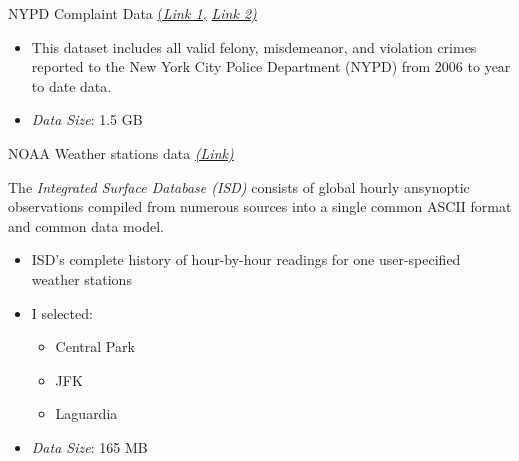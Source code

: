 \documentclass[10pt,ignorenonframetext,]{beamer}
\providecommand{\tightlist}{%
  \setlength{\itemsep}{0pt}\setlength{\parskip}{0pt}}
\begin{document}
\begin{frame}

\begin{block}{NYPD Complaint Data
\href{https://data.cityofnewyork.us/Public-Safety/NYPD-Complaint-Data-Historic/qgea-i56i}{(\emph{Link
1,}}
\href{https://data.cityofnewyork.us/Public-Safety/NYPD-Complaint-Data-Current-YTD/5uac-w243}{\emph{Link
2)}}}

\begin{itemize}
\item
  This dataset includes all valid felony, misdemeanor, and violation
  crimes reported to the New York City Police Department (NYPD) from
  2006 to year to date data.
\item
  \emph{Data Size}: 1.5 GB
\end{itemize}

\end{block}

\begin{block}{NOAA Weather stations data
\href{https://www.ncdc.noaa.gov/isd}{\emph{(Link)}}}

The \emph{Integrated Surface Database (ISD)} consists of global hourly
ansynoptic observations compiled from numerous sources into a single
common ASCII format and common data model.

\begin{itemize}
\item
  ISD’s complete history of hour-by-hour readings for one user-specified
  weather stations
\item
  I selected:

  \begin{itemize}
  \tightlist
  \item
    Central Park
  \item
    JFK
  \item
    Laguardia
  \end{itemize}
\item
  \emph{Data Size}: 165 MB
\end{itemize}

\end{block}

\end{frame}
\end{document}
